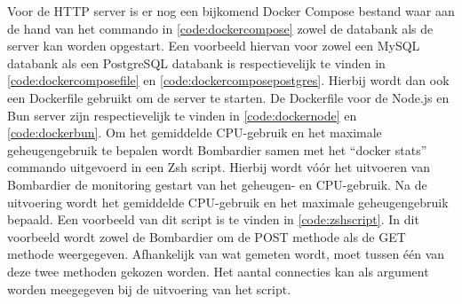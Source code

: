 Voor de HTTP server is er nog een bijkomend
Docker Compose bestand waar aan de hand van het commando in \ref{code:dockercompose}
zowel de databank als de server kan worden opgestart. Een voorbeeld hiervan voor zowel een MySQL databank als een PostgreSQL databank is 
respectievelijk te vinden in \ref{code:dockercomposefile} en \ref{code:dockercomposepostgres}.
Hierbij wordt dan ook een Dockerfile gebruikt om de server te starten. De Dockerfile voor de Node.js en Bun server 
zijn respectievelijk te vinden in \ref{code:dockernode} en \ref{code:dockerbun}. 
Om het gemiddelde CPU-gebruik en het maximale geheugengebruik te bepalen wordt Bombardier samen met het “docker stats” commando uitgevoerd in een Zsh script.
Hierbij wordt vóór het uitvoeren van Bombardier de monitoring gestart van het geheugen- en CPU-gebruik. 
Na de uitvoering wordt het gemiddelde CPU-gebruik en het maximale geheugengebruik bepaald.
Een voorbeeld van dit script is te vinden in \ref{code:zshscript}. 
In dit voorbeeld wordt zowel de Bombardier om de POST methode als de GET methode weergegeven. Afhankelijk van wat gemeten wordt, moet tussen één van deze twee methoden gekozen worden.
Het aantal connecties kan als argument worden meegegeven bij de uitvoering van het script.


